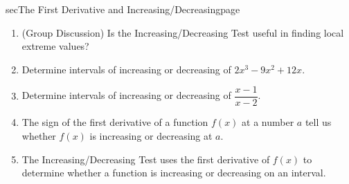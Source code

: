\documentclass[../main]{subfiles}
\begin{document}
\begin{outline}{sec}{The First Derivative and Increasing/Decreasing}{page}
\begin{enumerate}
    \item (Group Discussion) Is the Increasing/Decreasing Test useful in finding local extreme values?
    \item Determine intervals of increasing or decreasing of \href{https://www.wolframalpha.com/input?i=plot+2*x%5E3+-+9*x%5E2+%2B+12*x}{\(2x^{3} - 9 x^{2} + 12x\)}.
      \item Determine intervals of increasing or decreasing of \href{https://www.wolframalpha.com/input?i=plot+%28x-1%29%2F%28x-2%29}{\(\dfrac{x-1}{x-2}\)}.
    \item {The sign of the first derivative of a function \(f(x)\) at a number \(a\) tell us whether \(f(x)\) is increasing or decreasing at \(a\).}
    \item {The Increasing/Decreasing Test uses the first derivative of \(f(x)\) to determine whether a function is increasing or decreasing on an interval.}
  \end{enumerate}
\end{outline}
\end{document}
